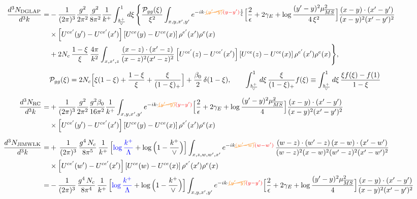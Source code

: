 \documentclass[9pt]{article}
\numberwithin{equation}{section}
\begin{document}
\begin{align}
\frac{d^{3}N_{\rm DGLAP}}{d^{3}k}= &-\frac{1}{(2\pi)^{3}}\frac{g^{2}}{2\pi^{2}}\frac{g^{2}}{8\pi^{2}}\frac{1}{k^{+}}\int_{\frac{k^{+}}{\vee}}^{1}d\xi\,\Bigg\{\frac{\mathcal P_{gg}(\xi)}{\xi^{2}}\int_{x,y,x',y'}e^{-ik\cdot{\color{orange}\cancel{(y'-y)}}{\color{red}(y-y')}\frac{1}{\xi}}\Big[\frac{2}{\epsilon}+2\gamma_{E}+\log\frac{(y'-y)^{2}\mu^{2}_{\overline{MS}}}{4\,\xi^{2}}\Big]\frac{(x-y)\cdot(x'-y')}{(x-y)^{2}(x'-y')^{2}}\notag\\
&\times\left[U^{ce'}(y') - U^{ce'}(x')\right]\left[U^{ce}(y) - U^{ce}(x)\right]\rho^{e'}(x')\rho^{e}(x)\notag\\
&+2N_{c}\,\frac{1-\xi}{\xi}\,\frac{4\pi}{k^{2}}\int_{x,x',z}\frac{(x-z)\cdot(x'-z)}{(x-z)^{2}(x'-z)^{2}}\left[U^{ce'}(z) - U^{ce'}(x')\right]\left[U^{ce}(z) - U^{ce}(x)\right]\rho^{e'}(x')\rho^{e}(x)\Bigg\},\\[4pt]
&\mathcal P_{gg}(\xi)=2N_{c}\Big[\xi(1-\xi)+\frac{1-\xi}{\xi}+\frac{\xi}{(1-\xi)_{+}}\Big]+\frac{\beta_{0}}{2}\,\delta(1-\xi),\qquad
\int_{\frac{k^{+}}{\vee}}^{1}d\xi\,\frac{\xi}{(1-\xi)_{+}}f(\xi)\equiv\int_{\frac{k^{+}}{\vee}}^{1}d\xi\,\frac{\xi f(\xi)-f(1)}{1-\xi}\notag\\[6pt]
\frac{d^{3}N_{\rm RC}}{d^{3}k}= & +\frac{1}{(2\pi)^{3}}\frac{g^{2}}{2\pi^{2}}\frac{g^{2}\beta_{0}}{16\pi^{2}}\frac{1}{k^{+}}\int_{x,y,x',y'}e^{-ik\cdot{\color{orange}\cancel{(y'-y)}}{\color{red}(y-y')}}\Big[\frac{2}{\epsilon}+2\gamma_{E}+\log\frac{(y'-y)^{2}\mu^{2}_{\overline{MS}}}{4}\Big]\frac{(x-y)\cdot(x'-y')}{(x-y)^{2}(x'-y')^{2}}\notag\\
&\times\left[U^{ce'}(y') - U^{ce'}(x')\right]\left[U^{ce}(y) - U^{ce}(x)\right]\rho^{e'}(x')\rho^{e}(x)\\[6pt]
\frac{d^{3}N_{\rm JIMWLK}}{d^{3}k}= & +\,\frac{1}{(2\pi)^{3}}\,\frac{g^{4}\,N_{c}}{8\pi^{5}}\,\frac{1}{k^{+}}\,\Big[{\color{blue}\log\frac{k^{+}}{\Lambda}}+\log\Big(1-\frac{k^{+}}{\vee}\Big)\Big]\int_{x,z,w,w',x'}e^{-ik{\color{orange}\cancel{(w'-w)}}{\color{red}(w-w')}}\,\frac{(w-z)\cdot (w'-z)\,(x-w)\cdot (x'-w')}{(w-z)^{2}(x-w)^{2}(w'-z)^{2}(x'-w')^{2}}\notag\\
&\times\left[U^{ce'}(w') - U^{ce'}(x')\right]\left[U^{ce}(w) - U^{ce}(x)\right]\rho^{e'}(x') \rho^{e}(x)\notag \\
= & -\frac{1}{(2\pi)^{3}}\,\frac{g^{4}\,N_{c}}{8\pi^{4}}\,\frac{1}{k^{+}}\,\Big[{\color{blue}\log\frac{k^{+}}{\Lambda}}+\log\Big(1-\frac{k^{+}}{\vee}\Big)\Big]\int_{x,y,x',y'}e^{-ik\cdot{\color{orange}\cancel{(y'-y)}}{\color{red}(y-y')}}\Big[\frac{2}{\epsilon}+2\gamma_{E}+\log\frac{(y'-y)^{2}\mu^{2}_{\overline{MS}}}{4}\Big]\frac{(x-y)\cdot(x'-y')}{(x-y)^{2}(x'-y')^{2}}\notag\\

\end{align}
\end{document}
